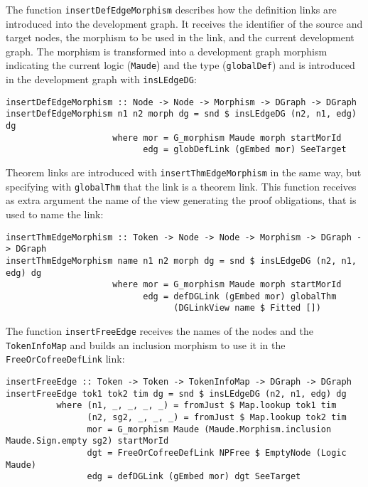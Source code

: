 The function \verb"insertDefEdgeMorphism" describes how the definition links
are introduced into the
development graph. It receives the identifier of the source and target
nodes, the morphism to be used in the link, and the current development
graph. The morphism is transformed into a development graph morphism
indicating the current logic (\verb"Maude") and the type (\verb"globalDef")
and is introduced in the development graph with \verb"insLEdgeDG":

{\codesize
\begin{verbatim}
insertDefEdgeMorphism :: Node -> Node -> Morphism -> DGraph -> DGraph
insertDefEdgeMorphism n1 n2 morph dg = snd $ insLEdgeDG (n2, n1, edg) dg
                     where mor = G_morphism Maude morph startMorId
                           edg = globDefLink (gEmbed mor) SeeTarget
\end{verbatim}
}

Theorem links are introduced with \verb"insertThmEdgeMorphism"
in the same way, but specifying with
\verb"globalThm" that the link is a theorem link. This function receives
as extra argument the name of the view generating the proof obligations,
that is used to name the link:

{\codesize
\begin{verbatim}
insertThmEdgeMorphism :: Token -> Node -> Node -> Morphism -> DGraph -> DGraph
insertThmEdgeMorphism name n1 n2 morph dg = snd $ insLEdgeDG (n2, n1, edg) dg
                     where mor = G_morphism Maude morph startMorId
                           edg = defDGLink (gEmbed mor) globalThm
                                 (DGLinkView name $ Fitted [])
\end{verbatim}
}

The function \verb"insertFreeEdge" receives the names of the nodes and
the \verb"TokenInfoMap" and builds an inclusion morphism to use it in
the \verb"FreeOrCofreeDefLink" link:

{\codesize
\begin{verbatim}
insertFreeEdge :: Token -> Token -> TokenInfoMap -> DGraph -> DGraph
insertFreeEdge tok1 tok2 tim dg = snd $ insLEdgeDG (n2, n1, edg) dg
          where (n1, _, _, _, _) = fromJust $ Map.lookup tok1 tim
                (n2, sg2, _, _, _) = fromJust $ Map.lookup tok2 tim
                mor = G_morphism Maude (Maude.Morphism.inclusion Maude.Sign.empty sg2) startMorId
                dgt = FreeOrCofreeDefLink NPFree $ EmptyNode (Logic Maude)
                edg = defDGLink (gEmbed mor) dgt SeeTarget
\end{verbatim}
}
























